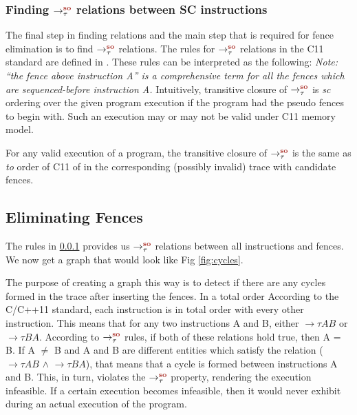 \subsubsection{Finding $\setSO$ relations between SC instructions}\label{to_rel}
The final step in finding relations and the main step that is required for 
fence elimination is to find $\setSO$ relations. The rules for $\setSO$ relations 
in the C11 standard are defined in \cite{C11}. These rules can be interpreted 
as the following:
%
\textit{Note: ``the fence above instruction A'' is a comprehensive term for all 
	the fences which are sequenced-before instruction A.}
Intuitively, transitive closure of $\setSO$ is \emph{sc} ordering over the 
given program execution if the program had the pseudo fences to begin with.
Such an execution may or may not be valid under C11 memory model.

\begin{theorem}
	For any valid execution of a program, the transitive closure of $\setSO$ 
	is the same as \emph{to} order of C11 of in the corresponding (possibly 
	invalid) trace with candidate fences.
\end{theorem}


\subsection{Eliminating Fences}
The rules in \textsection\ref{to_rel} provides us $\setSO$ relations between all 
instructions and fences. We now get a graph that would look 
like Fig \ref{fig:cycles}. 


\par
The purpose of creating a graph this way is to detect if there are any cycles 
formed in the trace after inserting the fences. 
In a total order 
According to the C/C++11 standard, each \mosc instruction is in total order 
with every other \mosc instruction. This means that for any two \mosc 
instructions A and B, either $\to{\tau}{A}{B}$ or $\to{\tau}{B}{A}$. According to 
$\setSO$ rules, if both of these relations hold true, then A = B. 
If A $\neq$ B and A and B are different entities which satisfy the 
relation ($\to{\tau}{A}{B}$ $\land$ $\to{\tau}{B}{A}$), that means that a cycle is 
formed between instructions A and B. This, in turn, violates the $\setSO$ 
property, rendering the execution infeasible. If a certain execution 
becomes infeasible, then it would never exhibit during an actual execution 
of the program.

